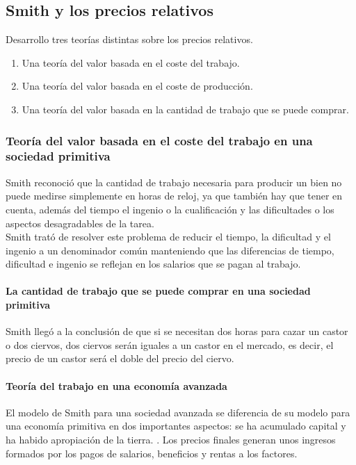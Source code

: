 \documentclass[10pt]{book}
\begin{document}
\subsection*{Smith y los precios relativos}
Desarrollo tres teorías distintas sobre los precios relativos.\\
\begin{enumerate}[\bfseries (1)]
    \item Una teoría del valor basada en el coste del trabajo.
    \item Una teoría del valor basada en el coste de producción.
    \item Una teoría del valor basada en la cantidad de trabajo que se puede comprar.
\end{enumerate}

\subsubsection*{Teoría del valor basada en el coste del trabajo en una sociedad primitiva}
Smith reconoció que la cantidad de trabajo necesaria para producir un bien no puede medirse simplemente en horas de reloj, ya que también hay que tener en cuenta, además del tiempo   el ingenio o la cualificación y las dificultades o los aspectos desagradables de la tarea. \\
Smith trató de resolver este problema de reducir el tiempo, la dificultad y el ingenio a un denominador común manteniendo que las diferencias de tiempo, dificultad e ingenio se reflejan en los salarios que se pagan al trabajo.

\paragraph*{La cantidad de trabajo que se puede comprar en una sociedad primitiva}
Smith llegó a la conclusión de que si se necesitan dos horas para cazar un castor o dos ciervos, dos ciervos serán iguales a un castor en el mercado, es decir, el precio de un castor será el doble del precio del ciervo.

\paragraph*{Teoría del trabajo en una economía avanzada}
El modelo de Smith para una sociedad avanzada se diferencia de su modelo para una economía primitiva en dos importantes aspectos: se ha acumulado capital y ha habido apropiación de la tierra. . Los precios finales generan unos ingresos formados por los pagos de salarios, beneficios y rentas a los factores.
\end{document}
